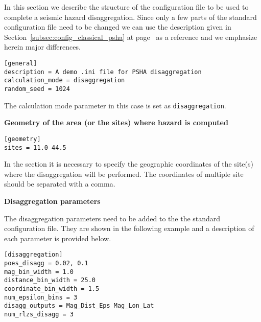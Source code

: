 In this section we describe the structure of the configuration file to be used
to complete a seismic hazard disaggregation. Since only a few parts of the
standard configuration file need to be changed we can use the description
given in Section~\ref{subsec:config_classical_psha} at
page~\pageref{subsec:config_classical_psha} as a reference and we emphasize
herein major differences.

\begin{verbatim}
[general]
description = A demo .ini file for PSHA disaggregation
calculation_mode = disaggregation
random_seed = 1024
\end{verbatim}

The calculation mode parameter in this case is set as
\texttt{disaggregation}.

\textbf{Geometry of the area (or the sites) where hazard is computed}

\begin{verbatim}
[geometry]
sites = 11.0 44.5
\end{verbatim}

In the section it is necessary to specify the geographic coordinates of
the site(s) where the disaggregation will be performed. The coordinates
of multiple site should be separated with a comma.

\textbf{Disaggregation parameters}

The disaggregation parameters need to be added to the the standard
configuration file. They are shown in the following example and a description
of each parameter is provided below.

\begin{verbatim}
[disaggregation]
poes_disagg = 0.02, 0.1
mag_bin_width = 1.0
distance_bin_width = 25.0
coordinate_bin_width = 1.5
num_epsilon_bins = 3
disagg_outputs = Mag_Dist_Eps Mag_Lon_Lat
num_rlzs_disagg = 3
\end{verbatim}

